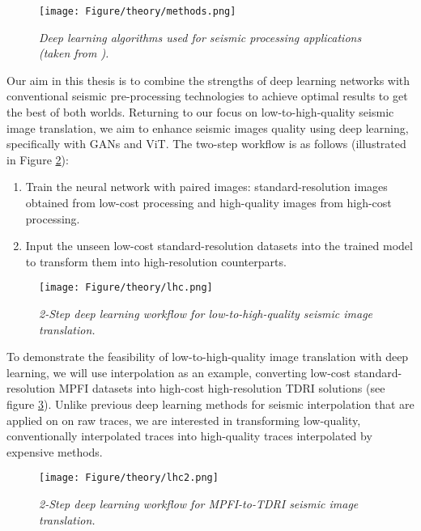 \begin{figure}[h]
	\centering
	\texttt{[image: Figure/theory/methods.png]} 
	\caption{\textit{Deep learning algorithms used for seismic processing applications (taken from ).}}
	\label{fig:methods}
\end{figure}
\newpage
\noindent 
Our aim in this thesis is to combine the strengths of deep learning networks with conventional seismic pre-processing technologies to achieve optimal results to get the best of both worlds. Returning to our focus on low-to-high-quality seismic image translation, we aim to enhance seismic images quality using deep learning, specifically with GANs and ViT. The two-step workflow is as follows (illustrated in Figure \ref{fig:lhc}):

\begin{enumerate}
	\item Train the neural network with paired images: standard-resolution images obtained from low-cost processing and high-quality images from high-cost processing.
	\item Input the unseen low-cost standard-resolution datasets into the trained model to transform them into high-resolution counterparts.
\end{enumerate}

\begin{figure}[h]
	\centering
	\texttt{[image: Figure/theory/lhc.png]} 
	\caption{\textit{2-Step deep learning workflow for low-to-high-quality seismic image translation.}}
	\label{fig:lhc}
\end{figure}

\noindent To demonstrate the feasibility of low-to-high-quality image translation with deep learning, we will use interpolation as an example, converting low-cost standard-resolution MPFI datasets into high-cost high-resolution TDRI solutions (see figure \ref{fig:lhc2}). Unlike previous deep learning methods for seismic interpolation that are applied on on raw traces, we are interested in transforming low-quality, conventionally interpolated traces into high-quality traces interpolated by expensive methods.

\begin{figure}[h]
	\centering
	\texttt{[image: Figure/theory/lhc2.png]} 
	\caption{\textit{2-Step deep learning workflow for MPFI-to-TDRI seismic image translation.}}
	\label{fig:lhc2}
\end{figure}

